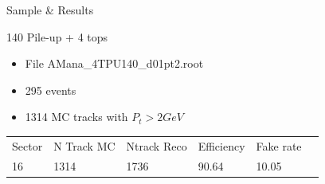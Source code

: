 \documentclass[10pt]{beamer}
\begin{document}
\begin{frame}{Sample \& Results}


\begin{block}{ 140 Pile-up + 4 tops}
  \begin{itemize}
    \item File AMana\_4TPU140\_d01pt2.root
    \item 295 events
    \item 1314 MC tracks with $P_t > 2 GeV$
  \end{itemize}
\end{block}
\pause
\begin{block}	

\begin{tabular}{llllll}
Sector & N Track MC & Ntrack Reco & Efficiency & Fake rate \\
  16   & 1314       & 1736        & 90.64      &  10.05  
\end{tabular}
	
\end{block}
\end{frame}
\end{document}
